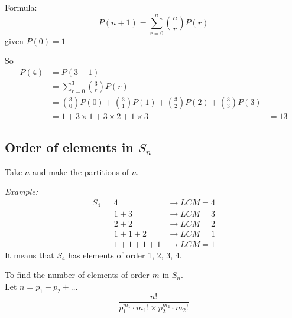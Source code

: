 \documentclass[11pt,letterpaper]{article}
\newenvironment{example}                             
        {\noindent\textit{Example:}\\}
	{}
\begin{document}
Formula: \[
  P(n+1) = \sum_{r=0}^n {n \choose r} P(r) 
\]
given $P(0) = 1$

So 
\begin{align*}
  P(4) &= P(3+1)\\ 
       &= \sum_{r=0}^3 {3 \choose r} P(r)\\ 
       &= {3 \choose 0} P(0) + {3 \choose 1} P(1) + {3 \choose 2} P(2) + {3 \choose 3} P(3) \\
       &= 1 + 3\times 1 + 3\times 2 + 1\times 3
       &= 13
\end{align*}

\subsection{Order of elements in $S_n$}
Take $n$ and make the partitions of $n$.

\begin{example}
  \begin{align*}
    S_4 && 4 &\rightarrow LCM = 4\\
        && 1 + 3 &\rightarrow LCM = 3\\
        && 2 + 2 &\rightarrow LCM = 2\\
        && 1 + 1 + 2 &\rightarrow LCM = 1\\
        && 1 + 1 + 1 + 1 &\rightarrow LCM = 1
  \end{align*}
  It means that $S_4$ has elements of order 1, 2, 3, 4.\\
\end{example}

\noindent To find the number of elements of order $m$ in $S_n$. \\
Let $n = p_1 + p_2 + \dots$\\

\[
  \frac{n!}{p_1^{m_1} \cdot m_1! \times p_2^{m_2} \cdot m_2!}
\]
\end{document}
